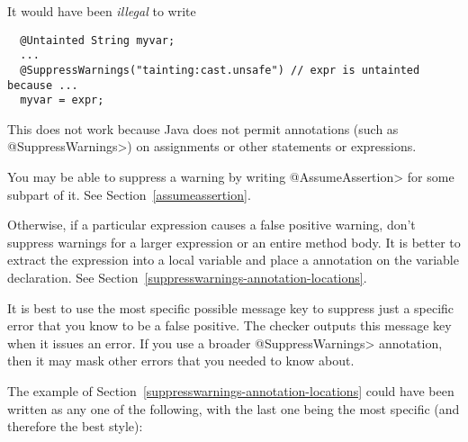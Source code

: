 \noindent
It would have been \emph{illegal} to write

\begin{smaller}
\begin{Verbatim}
  @Untainted String myvar;
  ...
  @SuppressWarnings("tainting:cast.unsafe") // expr is untainted because ...
  myvar = expr;
\end{Verbatim}
\end{smaller}

\noindent
This does not work because
Java does not permit annotations (such as \<@SuppressWarnings>) on
assignments or other statements or expressions.




You may be able to suppress a warning by writing
\<@AssumeAssertion> for some subpart of it.  See Section~\ref{assumeassertion}.

Otherwise, if a particular expression causes a false positive warning,
don't suppress warnings for a larger expression or an entire method body.
It is better to extract the expression into a local variable
and place a  annotation on the variable
declaration.  See Section~\ref{suppresswarnings-annotation-locations}.





\label{compiler-message-keys}

It is best to use the most specific possible message key to suppress just a
specific error that you know to be a false positive.  The checker outputs
this message key when it issues an error.  If you use a broader
\<@SuppressWarnings> annotation, then it may mask other errors that you
needed to know about.

The example of Section~\ref{suppresswarnings-annotation-locations} could
have been written as any one of the following, with the last one being the
most specific (and therefore the best style):

